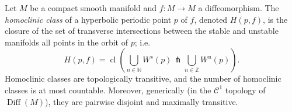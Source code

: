 \documentclass[12pt]{article}
\newcommand{\N}{\mathbb{N}}
\newcommand{\Z}{\mathbb{Z}}
\begin{document}
Let $M$ be a compact smooth manifold and $f\colon M\to M$ a diffeomorphism. The \emph{homoclinic class} of a hyperbolic periodic point $p$ of $f$, denoted $H(p,f)$, is the closure of the set of transverse intersections between the stable and unstable manifolds all points in the orbit of $p$; i.e.
$$H(p,f)=\operatorname{cl}\left(\bigcup_{n\in \N} W^s(p)\pitchfork \bigcup_{n\in \Z} W^u(p)\right).$$
Homoclinic classes are topologically transitive, and the number of homoclinic classes is at most countable. Moreover, generically (in the $\mathcal{C}^1$ topology of $\operatorname{Diff}(M)$), they are pairwise disjoint and maximally transitive.
\end{document}
